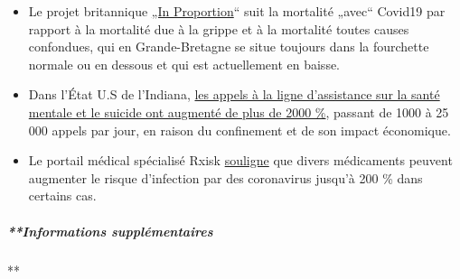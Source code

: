 \begin{itemize}
\item
  Le projet britannique \href{http://inproportion2.talkigy.com/}{„In
  Proportion}`` suit la mortalité „avec`` Covid19 par rapport à la
  mortalité due à la grippe et à la mortalité toutes causes confondues,
  qui en Grande-Bretagne se situe toujours dans la fourchette normale ou
  en dessous et qui est actuellement en baisse.
\item
  Dans l'État U.S de l'Indiana,
  \href{https://twitter.com/JesseKellyDC/status/1246449878219145216}{les
  appels à la ligne d'assistance sur la santé mentale et le suicide ont
  augmenté de plus de 2000 \%}, passant de 1000 à 25 000 appels par
  jour, en raison du confinement et de son impact économique.
\item
  Le portail médical spécialisé Rxisk
  \href{https://rxisk.org/medications-compromising-covid-infections/}{souligne}
  que divers médicaments peuvent augmenter le risque d'infection par des
  coronavirus jusqu'à 200 \% dans certains cas.
\end{itemize}

\hypertarget{informations-suppluxe9mentaires-1}{%
\subparagraph{**Informations
supplémentaires}\label{informations-suppluxe9mentaires-1}}

**

